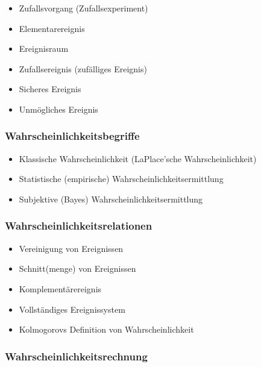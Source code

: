 \documentclass[
  a4paper,
  DIV=11]{scrreprt}
\providecommand{\tightlist}{%
  \setlength{\itemsep}{0pt}\setlength{\parskip}{0pt}}\usepackage{longtable,booktabs,array}
\theoremstyle{definition}
\theoremstyle{remark}
\begin{document}
\begin{itemize}
\tightlist
\item
  Zufallsvorgang (Zufallsexperiment)
\item
  Elementarereignis
\item
  Ereignisraum
\item
  Zufallsereignis (zufälliges Ereignis)
\item
  Sicheres Ereignis
\item
  Unmögliches Ereignis
\end{itemize}

\hypertarget{wahrscheinlichkeitsbegriffe}{%
\subsubsection{Wahrscheinlichkeitsbegriffe}\label{wahrscheinlichkeitsbegriffe}}

\begin{itemize}
\tightlist
\item
  Klassische Wahrscheinlichkeit (LaPlace'sche Wahrscheinlichkeit)
\item
  Statistische (empirische) Wahrscheinlichkeitsermittlung
\item
  Subjektive (Bayes) Wahrscheinlichkeitsermittlung
\end{itemize}

\hypertarget{wahrscheinlichkeitsrelationen}{%
\subsubsection{Wahrscheinlichkeitsrelationen}\label{wahrscheinlichkeitsrelationen}}

\begin{itemize}
\tightlist
\item
  Vereinigung von Ereignissen
\item
  Schnitt(menge) von Ereignissen
\item
  Komplementärereignis
\item
  Vollständiges Ereignissystem
\item
  Kolmogorovs Definition von Wahrscheinlichkeit
\end{itemize}

\hypertarget{wahrscheinlichkeitsrechnung}{%
\subsubsection{Wahrscheinlichkeitsrechnung}\label{wahrscheinlichkeitsrechnung}}
\end{document}

